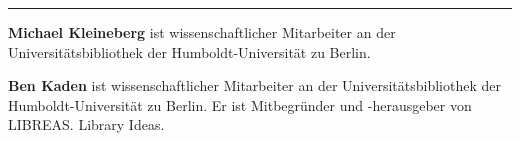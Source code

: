 \begin{center}\rule{0.5\linewidth}{\linethickness}\end{center}

\textbf{Michael Kleineberg} ist wissenschaftlicher Mitarbeiter an der
Universitätsbibliothek der Humboldt-Universität zu Berlin.

\textbf{Ben Kaden} ist wissenschaftlicher Mitarbeiter an der
Universitätsbibliothek der Humboldt-Universität zu Berlin. Er ist
Mitbegründer und -herausgeber von LIBREAS. Library Ideas.
